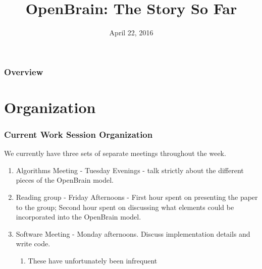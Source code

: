 \documentclass{beamer}
\title[Open Brain Project Presentation]{OpenBrain: The Story So Far}
\date{April 22, 2016} %
\begin{document}
\begin{frame}
\titlepage
\end{frame}

\begin{frame}

\begin{center}
\Huge 
\end{center}

\frametitle{Overview}
\tableofcontents
\end{frame}


\section{Organization} %

    \begin{frame}
        \frametitle{Current Work Session Organization}
        We currently have three sets of separate meetings throughout the week.
        \begin{enumerate}
        \item Algorithms Meeting - Tuesday Evenings - talk strictly about the different pieces of the OpenBrain model.
        \item Reading group - Friday Afternoons - First hour spent on presenting the paper to the group; Second hour spent on discussing what elements could be incorporated into the OpenBrain model.
        \item Software Meeting - Monday afternoons. Discuss implementation details and write code.
        \begin{enumerate}
        \item These have unfortunately been infrequent 
        \end{enumerate}
        \end{enumerate}
       
    \end{frame}
\end{document}
